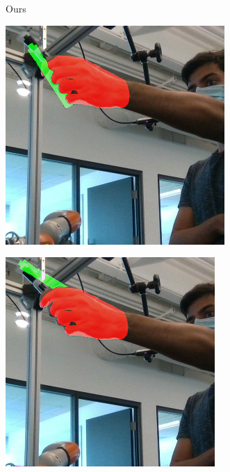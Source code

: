 \begin{figure}[h!]
\begin{subfigure}[b]{0.16\linewidth}
    \caption{Ours}
  \end{subfigure}
    \begin{subfigure}[b]{0.16\linewidth}
    \includegraphics[width=0.98\linewidth]{figs/180000_10}
    \caption{\cite{wang2019densefusion}}
  \end{subfigure}
    \begin{subfigure}[b]{0.16\linewidth}
    \includegraphics[width=0.98\linewidth]{figs/180000_13}
    \caption{\cite{castro2023crt}}
  \end{subfigure}  
  

\end{figure}
